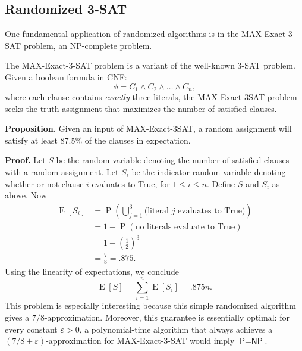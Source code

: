 \documentclass[14pt]{extreport}
\newcommand{\E}[1]{\operatorname{E}\left[#1\right]}
\renewcommand{\Pr}[1]{\operatorname{P}\left(#1\right)}
\begin{document}
\subsection*{Randomized 3-SAT}
    One fundamental application of randomized algorithms is in the \textsf{MAX-Exact-3-SAT} problem, an NP-complete problem. 
    \begin{tcolorbox}
        The \textsf{MAX-Exact-3-SAT} problem is a variant of the well-known 3-SAT problem. Given a boolean formula in CNF: $$\phi = C_{1} \land C_{2} \land \dots \land C_{n},$$ where each clause contains \textit{exactly} three literals, the \textsf{MAX-Exact-3SAT} problem seeks the truth assignment that maximizes the number of satisfied clauses.
    \end{tcolorbox}
    \vspace{5mm}
    \textbf{Proposition. } Given an input of \textsf{MAX-Exact-3SAT}, a random assignment will satisfy at least 87.5\% of the clauses in expectation.

    \vspace{5mm}
    \textbf{Proof.} Let $S$ be the random variable denoting the number of satisfied clauses with a random assignment. Let $S_{i}$ be the indicator random variable denoting whether or not clause $i$ evaluates to True, for $1 \le i \le n$. Define $S$ and $S_{i}$ as above. Now
    $$\begin{aligned}
        \E{S_{i}} &= \Pr{\bigcup_{j = 1}^{3} \text{(literal $j$ evaluates to True)}} \\
        &= 1 - \Pr{\text{no literals evaluate to True}} \\
        &= 1 - \left(\frac{1}{2}\right)^{3} \\
        &= \frac{7}{8} = .875.
    \end{aligned}$$
    Using the linearity of expectations, we conclude $$\E{S} = \sum_{i = 1}^{n}\E{S_{i}} = .875n.$$ This problem is especially interesting because this simple randomized algorithm gives a $7/8$-approximation. Moreover, this guarantee is essentially optimal: for every constant $\varepsilon > 0$, a polynomial-time algorithm that always achieves a $(7/8 + \varepsilon)$-approximation for \textsf{MAX-Exact-3-SAT} would imply $\textsf{P} = \textsf{NP}$.
     
         

    
\end{document}
